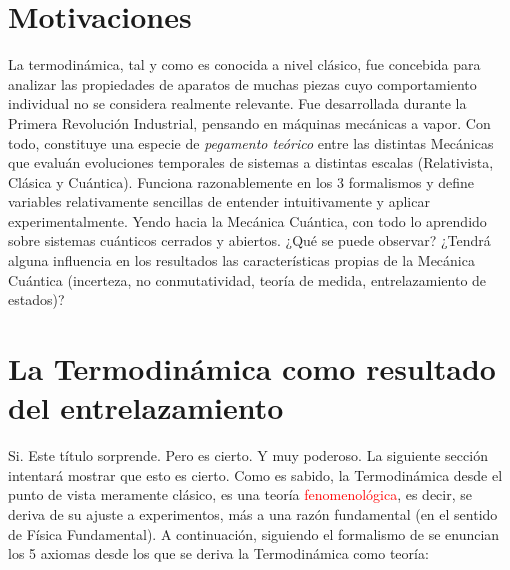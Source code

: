 \documentclass{book}
\begin{document}
\section{Motivaciones}
La termodinámica, tal y como es conocida a nivel clásico, fue concebida para analizar las propiedades de aparatos de muchas piezas cuyo comportamiento individual no se considera realmente relevante. Fue desarrollada durante la Primera Revolución Industrial, pensando en máquinas mecánicas a vapor. Con todo, constituye una especie de \textit{pegamento teórico} entre las distintas Mecánicas que evaluán evoluciones temporales de sistemas a distintas escalas (Relativista, Clásica y Cuántica). Funciona razonablemente en los 3 formalismos y define variables relativamente sencillas de entender intuitivamente y aplicar experimentalmente. Yendo hacia la Mecánica Cuántica, con todo lo aprendido sobre sistemas cuánticos cerrados y abiertos. ¿Qué se puede observar? ¿Tendrá alguna influencia en los resultados las características propias de la Mecánica Cuántica (incerteza, no conmutatividad, teoría de medida, entrelazamiento de estados)?
\section{La Termodinámica como resultado del entrelazamiento}
Si. Este título sorprende. Pero es cierto. Y muy poderoso. La siguiente sección intentará mostrar que esto es cierto. Como es sabido, la Termodinámica desde el punto de vista meramente clásico, es una teoría \textcolor{red}{fenomenológica}, es decir, se deriva de su ajuste a experimentos, más a una razón fundamental (en el sentido de Física Fundamental). A continuación, siguiendo el formalismo de \cite{bib3.1} se enuncian los 5 axiomas desde los que se deriva la Termodinámica como teoría: 
\end{document}
